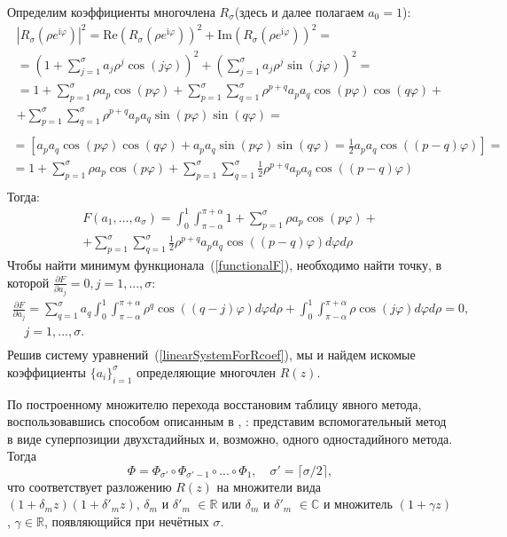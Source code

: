 \documentclass[a4paper, 14pt]{extreport} %
\begin{document}
Определим коэффициенты многочлена $R_{\sigma}$(здесь и далее полагаем $a_0=1$):
\begin{multline*}|R_{\sigma}(\rho e^{\mathrm i \varphi})|^2=\mathrm{Re}(R_{\sigma}(\rho e^{\mathrm i \varphi}))^2+\mathrm{Im}(R_{\sigma}(\rho e^{\mathrm i \varphi}))^2 =\\
=(1+\sum_{j=1}^\sigma a_j\rho^j\cos(j\varphi))^2+ (\sum_{j=1}^\sigma a_j\rho^j\sin(j\varphi))^2 =\\
= 1 + \sum_{p=1}^{\sigma}\rho a_p\cos(p\varphi) + \sum_{p=1}^\sigma \sum_{q=1}^\sigma\rho^{p+q}a_pa_q\cos(p\varphi)\cos(q \varphi)+ \\
+\sum_{p=1}^\sigma \sum_{q=1}^\sigma\rho^{p+q}a_pa_q\sin(p\varphi)\sin(q \varphi) =\\
\end{multline*}
\begin{multline*}
=\left[a_pa_q\cos(p\varphi)\cos(q\varphi)+a_pa_q\sin(p\varphi)\sin(q\varphi) =\frac{1}{2}a_pa_q\cos((p-q)\varphi)  \right]=\\
=1+\sum_{p=1}^{\sigma}\rho a_p\cos(p\varphi)+
\sum_{p=1}^\sigma \sum_{q=1}^\sigma\frac{1}{2}\rho^{p+q}a_pa_q \cos((p-q)\varphi)\\
\end{multline*}
Тогда:
\begin{multline}
\label{functionalF}
F(a_1,...,a_\sigma)=\int_0^1\int_{\pi-\alpha}^{\pi+\alpha}1+\sum_{p=1}^{\sigma}\rho a_p\cos(p\varphi)+\\+
\sum_{p=1}^\sigma \sum_{q=1}^\sigma\frac{1}{2}\rho^{p+q}a_pa_q \cos((p-q)\varphi)d\varphi d\rho
\end{multline}
Чтобы найти минимум функционала~(\ref{functionalF}), необходимо найти точку, в которой $\frac{\partial F}{\partial a_j} = 0, j=1,...,\sigma$:
\begin{multline}
\label{linearSystemForRcoef}
\frac{\partial F}{\partial a_j}=\sum_{q=1}^{\sigma}a_{q}\int_{0}^{1}\int_{\pi-\alpha}^{\pi+\alpha} \rho^q \cos((q-j)\varphi)d\varphi d\rho + \int_{0}^{1}\int_{\pi-\alpha}^{\pi+\alpha} \rho \cos(j\varphi)d\varphi d\rho=0 ,\\
\quad j=1,...,\sigma.\\
\end{multline}
Решив систему уравнений~(\ref{linearSystemForRcoef}), мы и найдем искомые коэффициенты $\{a_i\}_{i=1}^\sigma$ определяющие многочлен $R(z)$.

По построенному множителю перехода восстановим таблицу явного метода, воспользовавшись способом описанным в \cite{hairer}, \cite{Faleichik_amade}: представим вспомогательный метод в виде суперпозиции двухстадийных и, возможно, одного одностадийного метода. Тогда
$$
\Phi=\Phi_{\sigma'} \circ \Phi_{\sigma'-1} \circ...\circ \Phi_{1}, \quad \sigma' = \lceil \sigma/2\rceil,
$$
что соответствует разложению $R(z)$ на множители вида $(1+\delta_m z)(1+\delta'_m z)$, $\delta_m$ и $\delta'_m$ $\in \mathbb R$ или  $\delta_m$ и $\delta'_m$ $\in \mathbb C$
и множитель  $(1+\gamma z)$, $\gamma \in \mathbb R$, появляющийся при нечётных $\sigma$.
\end{document}
